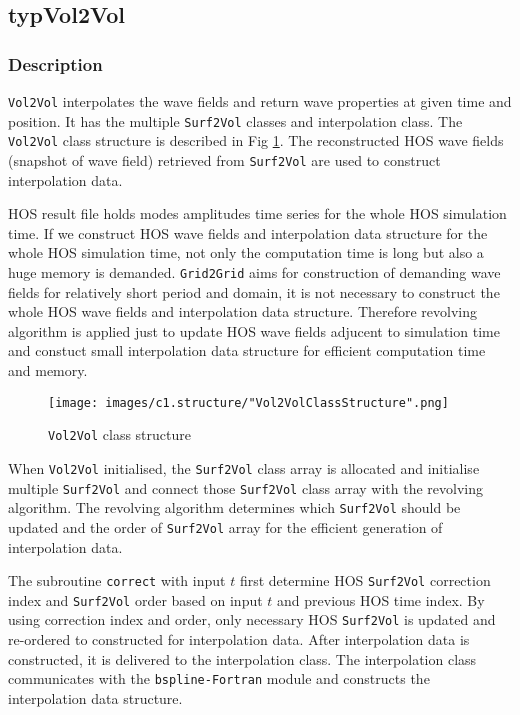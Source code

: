 	\pagebreak
	\subsection{typVol2Vol}

	\subsubsection{Description}

	\texttt{Vol2Vol} interpolates the wave fields and return wave properties at given time and position. It has the multiple \texttt{Surf2Vol} classes and interpolation class. The \texttt{Vol2Vol} class structure is described in Fig \ref{fig:vol2volStructure}. The reconstructed HOS wave fields (snapshot of wave field) retrieved from \texttt{Surf2Vol} are used to construct interpolation data. 
	
	HOS result file holds modes amplitudes time series for the whole HOS simulation time. If we construct HOS wave fields and interpolation data structure for the whole HOS simulation time, not only the computation time is long but also a huge memory is demanded.  \texttt{Grid2Grid} aims for construction of demanding wave fields for relatively short period and domain, it is not necessary to construct the whole HOS wave fields and interpolation data structure. Therefore revolving algorithm is applied just to update HOS wave fields adjucent to simulation time and constuct small interpolation data structure for efficient computation time and memory.

	\vspace{1em}
	{
		\begin{figure} [H]
			\centering
			\texttt{[image: images/c1.structure/"Vol2VolClassStructure".png]}
			\vspace{0.2cm}
			\caption{\texttt{Vol2Vol} class structure}
			\label{fig:vol2volStructure}
		\end{figure}
	}

	\pagebreak

	When \texttt{Vol2Vol} initialised, the \texttt{Surf2Vol} class array is allocated and initialise multiple \texttt{Surf2Vol} and connect those \texttt{Surf2Vol} class array with the revolving algorithm. The revolving algorithm determines which \texttt{Surf2Vol} should be updated and the order of \texttt{Surf2Vol} array for the efficient generation of interpolation data. 
	
	The subroutine \texttt{correct} with input $t$ first determine HOS \texttt{Surf2Vol} correction index and \texttt{Surf2Vol} order based on input $t$ and previous HOS time index. By using correction index and order, only necessary HOS \texttt{Surf2Vol} is updated and re-ordered to constructed for interpolation data. After interpolation data is constructed, it is delivered to the interpolation class. The interpolation class communicates with the \texttt{bspline-Fortran} module and constructs the interpolation data structure. 

